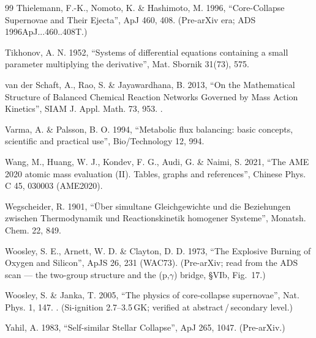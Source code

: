 \begin{thebibliography}{99}
Thielemann, F.-K., Nomoto, K. \& Hashimoto, M. 1996, ``Core-Collapse Supernovae
and Their Ejecta'', ApJ 460, 408. (Pre-arXiv era; ADS 1996ApJ...460..408T.)

Tikhonov, A. N. 1952, ``Systems of differential equations containing a small
parameter multiplying the derivative'', Mat. Sbornik 31(73), 575.

van der Schaft, A., Rao, S. \& Jayawardhana, B. 2013, ``On the Mathematical
Structure of Balanced Chemical Reaction Networks Governed by Mass Action
Kinetics'', SIAM J. Appl. Math. 73, 953. .

Varma, A. \& Palsson, B. O. 1994, ``Metabolic flux balancing: basic concepts,
scientific and practical use'', Bio/Technology 12, 994.

Wang, M., Huang, W. J., Kondev, F. G., Audi, G. \& Naimi, S. 2021, ``The AME
2020 atomic mass evaluation (II). Tables, graphs and references'', Chinese
Phys. C 45, 030003 (AME2020).

Wegscheider, R. 1901, ``\"Uber simultane Gleichgewichte und die Beziehungen
zwischen Thermodynamik und Reactionskinetik homogener Systeme'', Monatsh. Chem.
22, 849.

Woosley, S. E., Arnett, W. D. \& Clayton, D. D. 1973, ``The Explosive Burning
of Oxygen and Silicon'', ApJS 26, 231 (WAC73). (Pre-arXiv; read from the ADS
scan --- the two-group structure and the (p,$\gamma$)
bridge, \S VIb, Fig.~17.)

Woosley, S. \& Janka, T. 2005, ``The physics of core-collapse supernovae'',
Nat. Phys. 1, 147. . (Si-ignition 2.7--3.5\,GK;
verified at abstract\,/\,secondary level.)

Yahil, A. 1983, ``Self-similar Stellar Collapse'', ApJ 265, 1047. (Pre-arXiv.)

\end{thebibliography}
\endgroup
